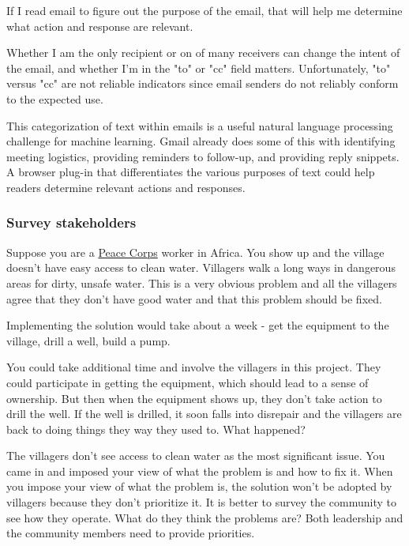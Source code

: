 If I read email to figure out the purpose of the email, that will help me determine what action and response are relevant. 

Whether I am the only recipient or on of many receivers can change the intent of the email, and whether I'm in the "to" or "cc" field matters. Unfortunately, "to" versus "cc" are not reliable indicators since email senders do not reliably conform to the expected use. 



This categorization of text within emails is a useful natural language processing challenge for machine learning. Gmail already does some of this with identifying meeting logistics, providing reminders to follow-up, and providing reply snippets. A browser plug-in that differentiates the various purposes of text could help readers determine relevant actions and responses. 



\subsubsection{Survey stakeholders}

Suppose you are a \href{http://www.peacecorps.gov/}{Peace Corps} worker in Africa. You show up and the village doesn't have easy access to clean water. Villagers walk a long ways in dangerous areas for dirty, unsafe water. This is a very obvious problem and all the villagers agree that they don't have good water and that this problem should be fixed.

Implementing the solution would take about a week - get the equipment to the village, drill a well, build a pump.

You could take additional time and involve the villagers in this project. They could participate in getting the equipment, which should lead to a sense of ownership.
But then when the equipment shows up, they don't take action to drill the well. If the well is drilled, it soon falls into disrepair and the villagers are back to doing things they way they used to. What happened?

The villagers don't see access to clean water as the most significant issue. You came in and imposed your view of what the problem is and how to fix it. When you impose your view of what the problem is, the solution won't be adopted by villagers because they don't prioritize it.
It is better to survey the community to see how they operate. What do they think the problems are?
Both leadership and the community members need to provide priorities.

